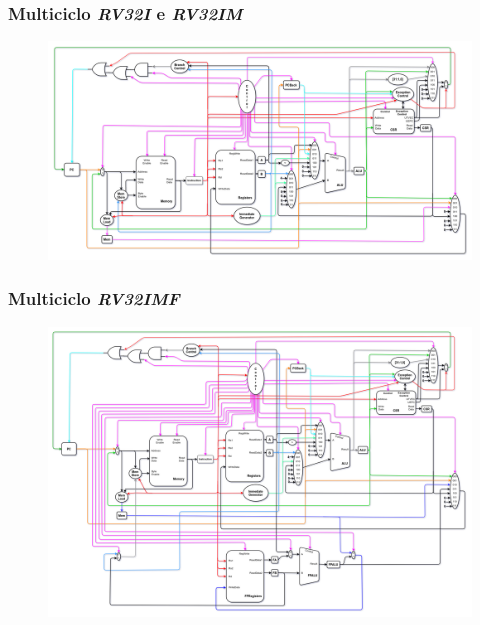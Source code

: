 \documentclass[aspectratio=169]{beamer}
\begin{document}
    \begin{frame}
        \frametitle{Multiciclo \textit{RV32I} e \textit{RV32IM}}
        \vfill
        \begin{figure}[H]
        \centering
            \includegraphics[width=.95\textwidth,height=.9\textheight,keepaspectratio]
            {../images/uarch_diagrams/multicycle-RV32I-RV32IM.png}
        \end{figure}
        \vfill
    \end{frame}

    \begin{frame}
        \frametitle{Multiciclo \textit{RV32IMF}}
        \vfill
        \begin{figure}[H]
        \centering
            \includegraphics[width=.9\textwidth,height=.85\textheight,keepaspectratio]
            {../images/uarch_diagrams/multicycle-RV32IMF.png}
        \end{figure}
        \vfill
    \end{frame}
\end{document}
